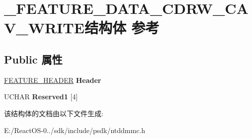 \hypertarget{struct___f_e_a_t_u_r_e___d_a_t_a___c_d_r_w___c_a_v___w_r_i_t_e}{}\section{\+\_\+\+F\+E\+A\+T\+U\+R\+E\+\_\+\+D\+A\+T\+A\+\_\+\+C\+D\+R\+W\+\_\+\+C\+A\+V\+\_\+\+W\+R\+I\+T\+E结构体 参考}
\label{struct___f_e_a_t_u_r_e___d_a_t_a___c_d_r_w___c_a_v___w_r_i_t_e}
\subsection*{Public 属性}
\begin{DoxyCompactItemize}
\item 
\mbox{\label{struct___f_e_a_t_u_r_e___d_a_t_a___c_d_r_w___c_a_v___w_r_i_t_e_a6f7a102329fec9f61c437012d510d04d}} 
\hyperlink{struct___f_e_a_t_u_r_e___h_e_a_d_e_r}{F\+E\+A\+T\+U\+R\+E\+\_\+\+H\+E\+A\+D\+ER} {\bfseries Header}
\item 
\mbox{\label{struct___f_e_a_t_u_r_e___d_a_t_a___c_d_r_w___c_a_v___w_r_i_t_e_a15c6cc4d80fcdeff5bdc817402c10f3b}} 
U\+C\+H\+AR {\bfseries Reserved1} \mbox{[}4\mbox{]}
\end{DoxyCompactItemize}


该结构体的文档由以下文件生成\+:\begin{DoxyCompactItemize}
\item 
E\+:/\+React\+O\+S-\/0../sdk/include/psdk/ntddmmc.\+h\end{DoxyCompactItemize}
